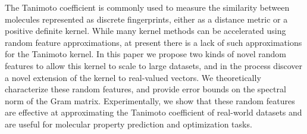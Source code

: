 The Tanimoto coefficient is commonly used to measure the similarity between molecules
represented as discrete fingerprints,
either as a distance metric or a positive definite kernel.
While many kernel methods can be accelerated using random feature approximations,
at present there is a lack of such approximations for the Tanimoto kernel.
In this paper we propose two kinds of novel random features to allow this kernel to scale to large datasets,
and in the process discover a novel extension of the kernel to real-valued vectors.
We theoretically characterize these random features, and provide error bounds on the spectral norm of the Gram matrix.
Experimentally, we show that these random features are effective at
approximating the Tanimoto coefficient of real-world datasets
and are useful for molecular property prediction and optimization tasks.
